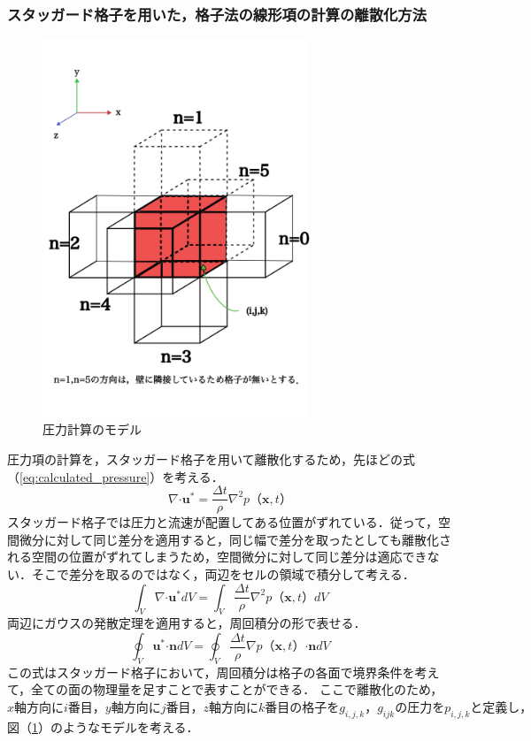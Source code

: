 \documentclass[a4j,12pt]{jreport}
\begin{document}
\subsubsection{スタッガード格子を用いた，格子法の線形項の計算の離散化方法}
\begin{figure}[htbp]
\begin{center}
\includegraphics[width=80mm]{pressure_model.png}
\caption{圧力計算のモデル}
\label{fig:pressure_model}
\end{center}
\end{figure}
圧力項の計算を，スタッガード格子を用いて離散化するため，先ほどの式（\ref{eq:calculated_pressure}）を考える．
$$\nabla\boldsymbol{\cdot}\bm{u}^* = \frac{\varDelta t}{\rho}\nabla^2 p（\bm{x},t）$$
スタッガード格子では圧力と流速が配置してある位置がずれている．従って，空間微分に対して同じ差分を適用すると，同じ幅で差分を取ったとしても離散化される空間の位置がずれてしまうため，空間微分に対して同じ差分は適応できない．そこで差分を取るのではなく，両辺をセルの領域で積分して考える．
$$\int_V\nabla\boldsymbol{\cdot}\bm{u}^* dV= \int_V\frac{\varDelta t}{\rho}\nabla^2 p（\bm{x},t）dV$$
両辺にガウスの発散定理を適用すると，周回積分の形で表せる．
$$\oint_V\bm{u}^*\boldsymbol{\cdot}\bm{n} dV= \oint_V\frac{\varDelta t}{\rho}\nabla p（\bm{x},t）\boldsymbol{\cdot}\bm{n}dV$$
この式はスタッガード格子において，周回積分は格子の各面で境界条件を考えて，全ての面の物理量を足すことで表すことができる．
ここで離散化のため，$x軸方向にi番目，y軸方向にj番目，z軸方向にk番目の格子をg_{i,j,k}，g_{ijk}の圧力をp_{i,j,k}と定義し，$図（\ref{fig:pressure_model}）のようなモデルを考える．
\end{document}
